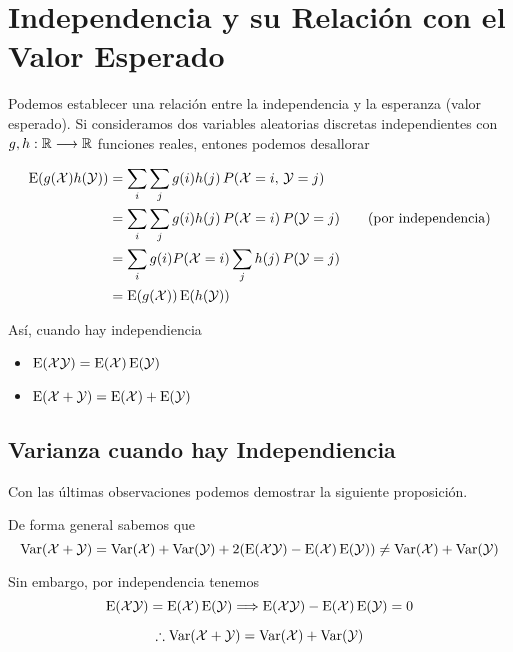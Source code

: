 \section{Independencia y su Relación con el Valor Esperado}
Podemos establecer una relación entre la independencia y la esperanza (valor esperado). Si consideramos dos variables aleatorias discretas independientes con $g,h : \bbR \longrightarrow \bbR$ funciones reales, entones podemos desallorar

\begin{align*}
  \E(g(\mcX)h(\mcY)) &= \sum_i \sum_j g(i)h(j)\,P(\mcX = i, \, \mcY = j)\\
                       &= \sum_i \sum_j g(i)h(j)\,P(\mcX = i)\,P(\mcY = j) \qquad (\text{por independencia}) \\
                       &= \sum_i g(i) P(\mcX = i) \sum_j h(j)\,P(\mcY = j)\\
                       &= \E(g(\mcX))\E(h(\mcY))
\end{align*}



Así, cuando hay independiencia
\begin{itemize}
  \item $\E(\mcX \mcY) = \E(\mcX) \E(\mcY)$
  \item $\E (\mcX + \mcY) = \E (\mcX) + \E(\mcY)$
\end{itemize}

\subsection{Varianza cuando hay Independiencia}
Con las últimas observaciones podemos demostrar la siguiente proposición.


\begin{myproof}
  De forma general sabemos que
  \[\Var(\mcX + \mcY) = \Var(\mcX) + \Var(\mcY) + 2(\E(\mcX \mcY) - \E(\mcX)\E(\mcY)) \neq \Var(\mcX) + \Var(\mcY)\]

  Sin embargo, por independencia tenemos
  \[\E(\mcX \mcY) = \E(\mcX)\E(\mcY) \Longrightarrow \E(\mcX \mcY) - \E(\mcX)\E(\mcY) = 0\]

  \[\therefore \Var(\mcX + \mcY) = \Var(\mcX) + \Var(\mcY)\]
\end{myproof}


